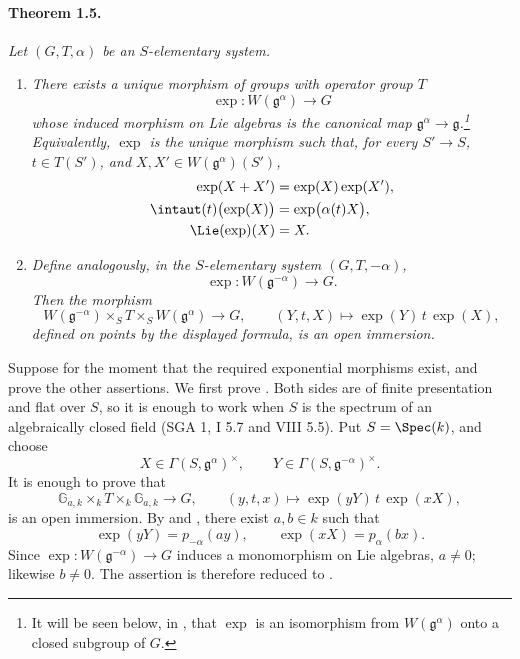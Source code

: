 \paragraph{\textbf{Theorem 1.5.}}
\emph{Let \((G,T,\alpha)\) be an \(S\)-elementary system.}
\begin{enumerate}
\item[\textup{\SGAInlineRefTarget{sga3:xx:1.5:item:i}(i)}] \emph{There exists a unique morphism of groups
  with operator group \(T\)
  \[
    \exp\colon W(\mathfrak g^\alpha)\longrightarrow G
  \]
  whose induced morphism on Lie algebras is the canonical map
  \(\mathfrak g^\alpha\to\mathfrak g\).\footnote{It will be seen
  below, in , that \(\exp\) is an isomorphism from
  \(W(\mathfrak g^\alpha)\) onto a closed subgroup of \(G\).}
  Equivalently, \(\exp\) is the unique morphism such that, for every
  \(S'\to S\), \(t\in T(S')\), and
  \(X,X'\in W(\mathfrak g^\alpha)(S')\),
  \[
  \begin{aligned}
    \exp(X+X')&=\exp(X)\exp(X'),\\
    \intaut(t)\bigl(\exp(X)\bigr)&=\exp\bigl(\alpha(t)X\bigr),\\
    \Lie(\exp)(X)&=X.
  \end{aligned}
  \]}
\item[\textup{\SGAInlineRefTarget{sga3:xx:1.5:item:ii}(ii)}] \emph{Define analogously, in the
  \(S\)-elementary system \((G,T,-\alpha)\),
  \[
    \exp\colon W(\mathfrak g^{-\alpha})\longrightarrow G.
  \]
  Then the morphism
  \[
    W(\mathfrak g^{-\alpha})\times_S T
      \times_S W(\mathfrak g^\alpha)\longrightarrow G,
    \qquad
    (Y,t,X)\longmapsto \exp(Y)\,t\,\exp(X),
  \]
  defined on points by the displayed formula, is an open
  immersion.}
\end{enumerate}

Suppose for the moment that the required exponential morphisms
exist, and prove the other assertions. We first prove \textup{}.
Both sides are of finite presentation and flat over \(S\), so it is
enough to work when \(S\) is the spectrum of an algebraically closed
field \textup{(SGA 1, I 5.7 and VIII 5.5)}. Put \(S=\Spec(k)\), and
choose
\[
  X\in\Gamma(S,\mathfrak g^\alpha)^\times,
  \qquad
  Y\in\Gamma(S,\mathfrak g^{-\alpha})^\times.
\]
It is enough to prove that
\[
  \mathbb G_{a,k}\times_k T\times_k\mathbb G_{a,k}
    \longrightarrow G,
  \qquad
  (y,t,x)\longmapsto \exp(yY)\,t\,\exp(xX),
\]
is an open immersion. By  and , there exist \(a,b\in k\)
such that
\[
  \exp(yY)=p_{-\alpha}(ay),
  \qquad
  \exp(xX)=p_\alpha(bx).
\]
Since
\(\exp\colon W(\mathfrak g^{-\alpha})\to G\) induces a monomorphism
on Lie algebras, \(a\neq0\); likewise \(b\neq0\). The assertion is
therefore reduced to .

